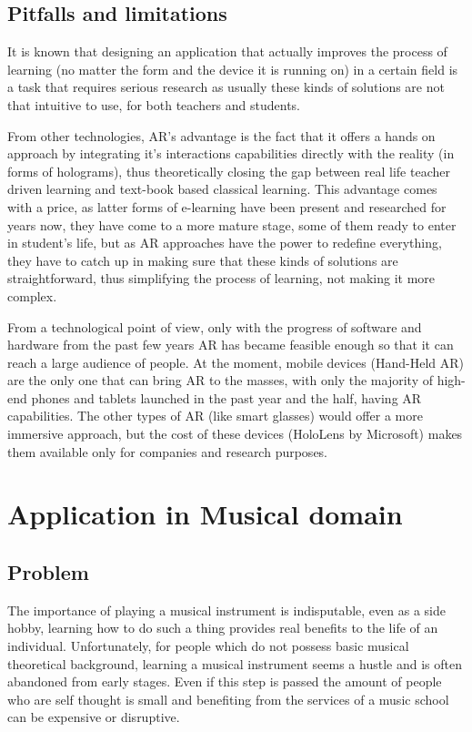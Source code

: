 \documentclass[12 pct]{report}
\begin{document}
\section{Pitfalls and limitations}
It is known that designing an application that actually improves the process of learning (no matter the form and the device it is running on) in a certain field is a task that requires serious research as usually these kinds of solutions are not that intuitive to use, for both teachers and students. 

From other technologies, AR's advantage is the fact that it offers a hands on approach by integrating it's interactions capabilities directly with the reality (in forms of holograms), thus theoretically closing the gap between real life teacher driven learning and text-book based classical learning. This advantage comes with a price, as latter forms of e-learning have been present and researched for years now, they have come to a more mature stage, some of them ready to enter in student's life, but as AR approaches have the power to redefine everything, they have to catch up in making sure that these kinds of solutions are straightforward, thus simplifying the process of learning, not making it more complex.

From a technological point of view, only with the progress of software and hardware from the past few years AR has became feasible enough so that it can reach a large audience of people. At the moment, mobile devices (Hand-Held AR) are the only one that can bring AR to the masses, with only the majority of high-end phones and tablets launched in the past year and the half, having AR capabilities. The other types of AR (like smart glasses) would offer a more immersive approach, but the cost of these devices (HoloLens by Microsoft) makes them available only for companies and research purposes.



\chapter{Application in Musical domain}

\section{Problem}
The importance of playing a musical instrument is indisputable, even as a side hobby, learning how to do such a thing provides real benefits to the life of an individual. Unfortunately, for people which do not possess basic musical theoretical background, learning a musical instrument seems a hustle and is often abandoned from early stages. Even if this step is passed the amount of people who are self thought is small and benefiting from the services of a music school can be expensive or disruptive. 
\end{document}
